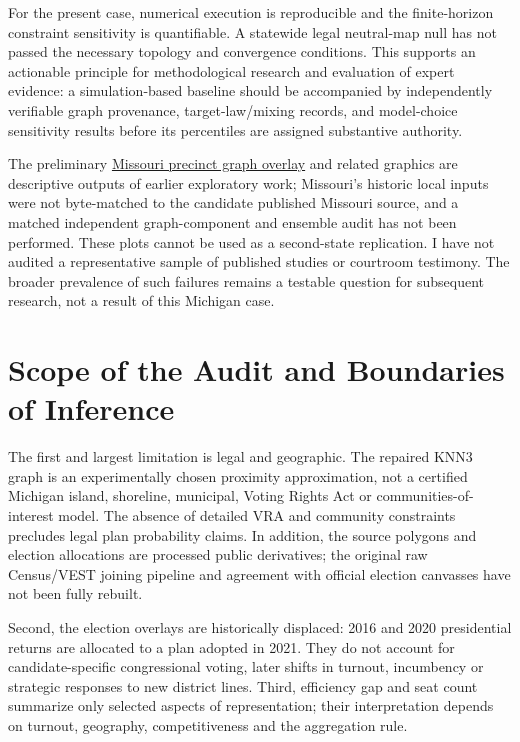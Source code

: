 \documentclass[
  10pt,
]{article}
\begin{document}
For the present case, numerical execution is reproducible and the
finite-horizon constraint sensitivity is quantifiable. A statewide legal
neutral-map null has not passed the necessary topology and convergence
conditions. This supports an actionable principle for methodological
research and evaluation of expert evidence: a simulation-based baseline
should be accompanied by independently verifiable graph provenance,
target-law/mixing records, and model-choice sensitivity results before
its percentiles are assigned substantive authority.

The preliminary
\href{https://github.com/DjokovicMan22/Gerrymandering-Project/blob/research/stages-1-3-validation/outputs/figures/week1/mo_precinct_dual_graph_overlay.png}{Missouri
precinct graph overlay} and related graphics are descriptive outputs of
earlier exploratory work; Missouri's historic local inputs were not
byte-matched to the candidate published Missouri source, and a matched
independent graph-component and ensemble audit has not been performed.
These plots cannot be used as a second-state replication. I have not
audited a representative sample of published studies or courtroom
testimony. The broader prevalence of such failures remains a testable
question for subsequent research, not a result of this Michigan case.

\hypertarget{scope-of-the-audit-and-boundaries-of-inference}{%
\section{Scope of the Audit and Boundaries of
Inference}\label{scope-of-the-audit-and-boundaries-of-inference}}

The first and largest limitation is legal and geographic. The repaired
KNN3 graph is an experimentally chosen proximity approximation, not a
certified Michigan island, shoreline, municipal, Voting Rights Act or
communities-of-interest model. The absence of detailed VRA and community
constraints precludes legal plan probability claims. In addition, the
source polygons and election allocations are processed public
derivatives; the original raw Census/VEST joining pipeline and agreement
with official election canvasses have not been fully rebuilt.

Second, the election overlays are historically displaced: 2016 and 2020
presidential returns are allocated to a plan adopted in 2021. They do
not account for candidate-specific congressional voting, later shifts in
turnout, incumbency or strategic responses to new district lines. Third,
efficiency gap and seat count summarize only selected aspects of
representation; their interpretation depends on turnout, geography,
competitiveness and the aggregation rule.
\end{document}
